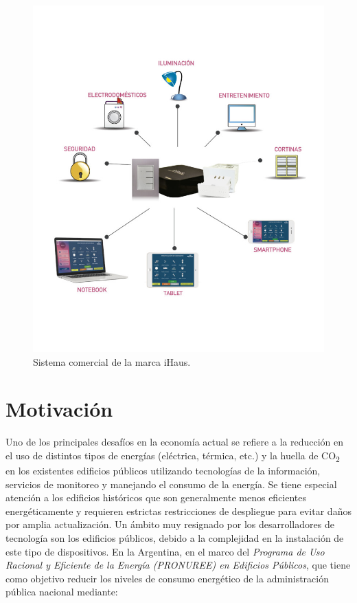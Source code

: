 \begin{figure}[h]
	\centering
	\includegraphics[width=.65\textwidth]{./Figures/ihausesquema.jpg}
	\caption{Sistema comercial de la marca iHaus.}
	\label{fig:ihausesquema}
\end{figure}


\section{Motivación}

Uno de los principales desafíos en la economía actual se refiere a la reducción en el uso de distintos tipos de energías (eléctrica, térmica, etc.) y la huella de CO\textsubscript{2} en los existentes edificios públicos utilizando tecnologías de la información, servicios de monitoreo y manejando el consumo de la energía. Se tiene especial atención a los edificios históricos que son generalmente menos eficientes energéticamente y requieren estrictas restricciones de despliegue para evitar daños por amplia actualización.
Un ámbito muy resignado por los desarrolladores de tecnología son los edificios públicos, debido a la complejidad en la instalación de este tipo de dispositivos. En la Argentina, en el marco del {\textit{Programa de Uso Racional y Eficiente de la Energía (PRONUREE) en Edificios Públicos}}, que tiene como objetivo reducir los niveles de consumo energético de la administración pública nacional mediante:

